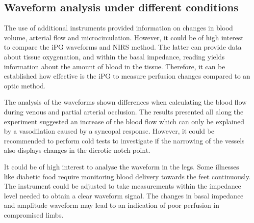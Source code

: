 \subsection{Waveform analysis under different conditions}
The use of additional instruments provided information on changes in blood volume, arterial flow and microcirculation. However, it could be of high interest to compare the iPG waveforms and NIRS method. The latter can provide data about tissue oxygenation, and within the basal impedance, reading yields information about the amount of blood in the tissue. Therefore, it can be established how effective is the iPG to measure perfusion changes compared to an optic method.

The analysis of the waveforms shown differences when calculating the blood flow during venous and partial arterial occlusion. The results presented all along the experiment suggested an increase of the blood flow which can only be explained by a vasodilation caused by a syncopal response. However, it could be recommended to perform cold tests to investigate if the narrowing of the vessels also displays changes in the dicrotic notch point.

It could be of high interest to analyse the waveform in the legs. Some illnesses like diabetic food require monitoring blood delivery towards the feet continuously. The instrument could be adjusted to take measurements within the impedance level needed to obtain a clear waveform signal. The changes in basal impedance and amplitude waveform may lead to an indication of poor perfusion in compromised limbs.


